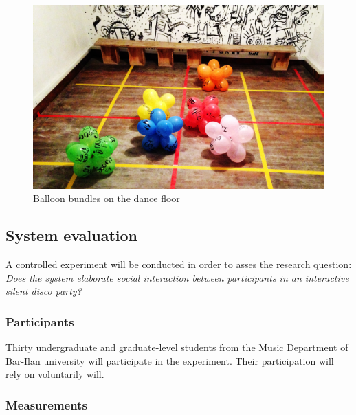 \documentclass[a4paper,11pt]{article}
\begin{document}
\begin{figure}[h]
	\includegraphics[width=\linewidth]{balloons}
	\caption{Balloon bundles on the dance floor}
\end{figure}

\subsection{System evaluation}\label{methods:evaluation}

A controlled experiment will be conducted in order to asses the research question: \emph{Does the system elaborate social interaction between participants in an interactive silent disco party?}

\subsubsection{Participants}

Thirty undergraduate and graduate-level students from the Music Department of Bar-Ilan university will participate in the experiment.
Their participation will rely on voluntarily will.

\subsubsection{Measurements}
\end{document}
